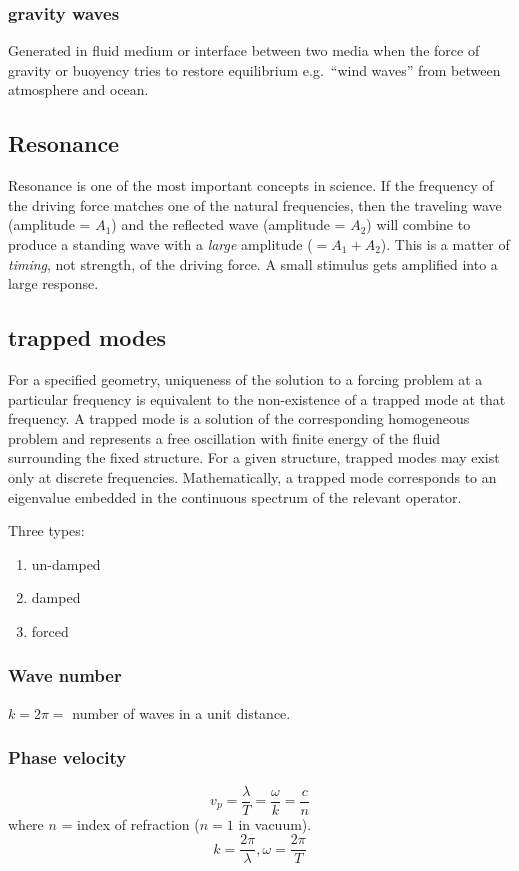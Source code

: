 \documentclass{article}
\begin{document}
\subsubsection{gravity waves}
Generated in fluid medium or interface between two media when the
force of gravity or buoyency tries to restore equilibrium
e.g.\ ``wind waves'' from between atmosphere and ocean.

\subsection{Resonance}
Resonance is one of the most important concepts in science.
If the frequency of the driving force matches one of the natural frequencies,
then the traveling wave (amplitude = $A_{1}$)
and the reflected wave (amplitude = $A_{2}$)
will combine to produce a
standing wave with a \emph{large} amplitude ($=A_{1} + A_{2}$).
This is a matter of \emph{timing}, not strength, of the driving force.
A small stimulus gets amplified into a large response.

\subsection{trapped modes}
For a specified geometry, uniqueness of the solution to a forcing problem
at a particular frequency is equivalent to the non-existence of a trapped
mode at that frequency. A trapped mode is a solution of the corresponding
homogeneous problem and represents a free oscillation with finite energy
of the fluid surrounding the fixed structure. For a given structure,
trapped modes may exist only at discrete frequencies.
Mathematically, a trapped mode corresponds to an eigenvalue embedded
in the continuous spectrum of the relevant operator.

Three types:
\begin{enumerate}
    \item un-damped
    \item damped
    \item forced
\end{enumerate}

\subsubsection{Wave number}
$k=2\pi=$ number of waves in a unit distance.

\subsubsection{Phase velocity}
\[
    v_{p} = \frac{\lambda}{T} = \frac{\omega}{k} = \frac{c}{n}
    \]
where $n$ = index of refraction ($n = 1$ in vacuum).
\[
    k = \frac{2\pi}{\lambda}, \omega = \frac{2\pi}{T}
    \]
\end{document}
